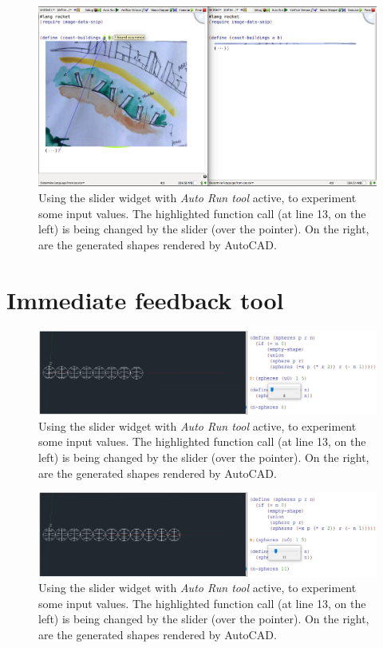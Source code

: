 \begin{figure}[!h]
  \centering
  \includegraphics[width=1\textwidth]{images/coast}
    \caption{Using the slider widget with \textit{Auto Run tool} active, to experiment some input values. The highlighted function call (at line 13, on the left) is being changed by the slider (over the pointer). On the right, are the generated shapes rendered by AutoCAD.}
  \label{fig:coast}
\end{figure}


\section{Immediate feedback tool}

\begin{figure}[!h]
  \centering
  \includegraphics[width=1\textwidth]{images/sliders1}
    \caption{Using the slider widget with \textit{Auto Run tool} active, to experiment some input values. The highlighted function call (at line 13, on the left) is being changed by the slider (over the pointer). On the right, are the generated shapes rendered by AutoCAD.}
  \label{fig:s1}
\end{figure}

\begin{figure}[!h]
  \centering
  \includegraphics[width=1\textwidth]{images/sliders2}
    \caption{Using the slider widget with \textit{Auto Run tool} active, to experiment some input values. The highlighted function call (at line 13, on the left) is being changed by the slider (over the pointer). On the right, are the generated shapes rendered by AutoCAD.}
  \label{fig:s2}
\end{figure}

